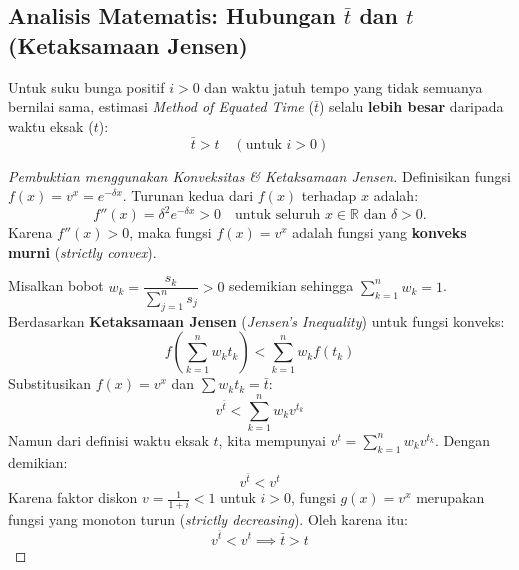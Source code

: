 \documentclass[11pt,a4paper]{article}
\begin{document}
\subsection{Analisis Matematis: Hubungan $\bar{t}$ dan $t$ (Ketaksamaan Jensen)}

\begin{definitionbox}
Untuk suku bunga positif $i > 0$ dan waktu jatuh tempo yang tidak semuanya bernilai sama, estimasi \textit{Method of Equated Time} ($\bar{t}$) selalu \textbf{lebih besar} daripada waktu eksak ($t$):
\begin{equation}
    \bar{t} > t \quad (\text{untuk } i > 0)
\end{equation}
\end{definitionbox}

\begin{proof}[Pembuktian menggunakan Konveksitas \& Ketaksamaan Jensen]
Definisikan fungsi $f(x) = v^x = e^{-\delta x}$. 
Turunan kedua dari $f(x)$ terhadap $x$ adalah:
\begin{equation*}
    f''(x) = \delta^2 e^{-\delta x} > 0 \quad \text{untuk seluruh } x \in \mathbb{R} \text{ dan } \delta > 0.
\end{equation*}
Karena $f''(x) > 0$, maka fungsi $f(x) = v^x$ adalah fungsi yang \textbf{konveks murni} (\textit{strictly convex}).

Misalkan bobot $w_k = \dfrac{s_k}{\sum_{j=1}^n s_j} > 0$ sedemikian sehingga $\sum_{k=1}^n w_k = 1$.
Berdasarkan \textbf{Ketaksamaan Jensen} (\textit{Jensen's Inequality}) untuk fungsi konveks:
\begin{equation*}
    f\left( \sum_{k=1}^n w_k t_k \right) < \sum_{k=1}^n w_k f(t_k)
\end{equation*}
Substitusikan $f(x) = v^x$ dan $\sum w_k t_k = \bar{t}$:
\begin{equation*}
    v^{\bar{t}} < \sum_{k=1}^n w_k v^{t_k}
\end{equation*}
Namun dari definisi waktu eksak $t$, kita mempunyai $v^t = \sum_{k=1}^n w_k v^{t_k}$. Dengan demikian:
\begin{equation*}
    v^{\bar{t}} < v^t
\end{equation*}
Karena faktor diskon $v = \frac{1}{1+i} < 1$ untuk $i > 0$, fungsi $g(x) = v^x$ merupakan fungsi yang monoton turun (\textit{strictly decreasing}). Oleh karena itu:
\begin{equation*}
    v^{\bar{t}} < v^t \implies \bar{t} > t
\end{equation*}
\end{proof}
\end{document}
